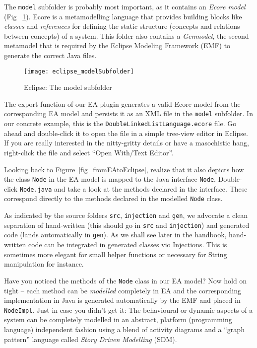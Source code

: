 The  \texttt{model} subfolder is probably most important, as it contains an  \emph{Ecore model} (Fig ~\ref{fig_modelSubfolder}).  
Ecore is a metamodelling language that provides building  blocks like \emph{classes} and \emph{references} for defining the  static structure (concepts and relations between concepts) of a system. This folder also contains a \emph{Genmodel}, the second metamodel that is required by the Eclipse Modeling Framework (EMF) to generate the correct Java files.

\begin{figure}[htbp]
	\centering
  \texttt{[image: eclipse\_modelSubfolder]}
	\caption{Eclipse: The model subfolder}
	\label{fig_modelSubfolder}
\end{figure}

The  export function of our EA plugin generates a valid Ecore model from the  corresponding EA model and persists it as an XML file in the \texttt{model}  subfolder.  
In our concrete example, this is the \texttt{DoubleLinkedListLanguage.ecore} file.  
Go ahead and double-click it to open the file in a simple tree-view editor in Eclipse.  
If you are really interested in the nitty-gritty details or have a masochistic hang, right-click the file and select ``Open With/Text Editor''.

Looking back to Figure~\ref{fig_fromEAtoEclipse}, realize that it also depicts how the class \texttt{Node} in the EA model is mapped to the Java interface \texttt{Node}.  
Double-click \texttt{Node.java} and take a look at the methods declared in the interface. These correspond directly to the methods declared in the modelled \texttt{Node} class.  

As indicated by the source folders \texttt{src}, \texttt{injection} and \texttt{gen}, we advocate a clean separation of hand-written (this should go in \texttt{src} and \texttt{injection}) and generated code (lands automatically in \texttt{gen}).  
As we shall see later in the handbook, hand-written code can be integrated in generated classes vio Injections. 
This is sometimes more elegant for small helper functions or necessary for String manipulation for instance.

Have you noticed the methods of the \texttt{Node} class in our EA model? 
Now hold on tight -- each method can be \emph{modelled} completely in EA and the corresponding implementation in Java is generated automatically by the EMF and placed in \texttt{NodeImpl}.  
Just in case you didn't get it: The behavioural or dynamic aspects of a system can be completely modelled in an abstract, platform (programming language) independent fashion using a blend of activity  diagrams and a ``graph pattern'' language called \textit{Story Driven Modelling} (SDM).  

